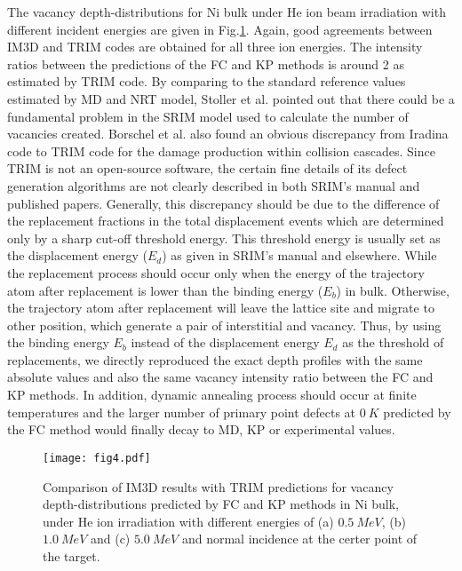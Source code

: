 The vacancy depth-distributions for Ni bulk under He ion beam irradiation with different incident energies are given in Fig.\ref{Fig.4}. Again, good agreements between IM3D and TRIM codes are obtained for all three ion energies. The intensity ratios between the predictions of the FC and KP methods is around 2 as estimated by TRIM code\cite{Stoller:2013}. By comparing to the standard reference values estimated by MD and NRT model, Stoller et al. pointed out that there could be a fundamental problem in the SRIM model used to calculate the number of vacancies created\cite{Stoller:2013}. Borschel et al. also found an obvious discrepancy from Iradina code to TRIM code for the damage production within collision cascades\cite{Borschel:2011}. Since TRIM is not an open-source software, the certain fine details of its defect generation algorithms are not clearly described in both SRIM's manual and published papers\cite{Ziegler:2010}. Generally, this discrepancy should be due to the difference of the replacement fractions in the total displacement events which are determined only by a sharp cut-off threshold energy\cite{Borschel:2011}. This threshold energy is usually set as the displacement energy ($E_d$) as given in SRIM's manual and elsewhere\cite{Ziegler:2010,Borschel:2011}. While the replacement process should occur only when the energy of the trajectory atom after replacement is lower than the binding energy ($E_b$) in bulk. Otherwise, the trajectory atom after replacement will leave the lattice site and migrate to other position, which generate a pair of interstitial and vacancy. Thus, by using the binding energy $E_b$ instead of the displacement energy $E_d$ as the threshold of replacements, we directly reproduced the exact depth profiles with the same absolute values and also the same vacancy intensity ratio between the FC and KP methods. In addition, dynamic annealing process should occur at finite temperatures and the larger number of primary point defects at $0~K$ predicted by the FC method would finally decay to MD, KP or experimental values.

\begin{figure}[!ht]\centering
\texttt{[image: fig4.pdf]}
\caption{Comparison of IM3D results with TRIM predictions for vacancy depth-distributions predicted by FC and KP methods in Ni bulk, under He ion irradiation with different energies of (a) $0.5~MeV$, (b) $1.0~MeV$ and (c) $5.0~MeV$ and normal incidence at the certer point of the target.} \label{Fig.4}
\end{figure}

